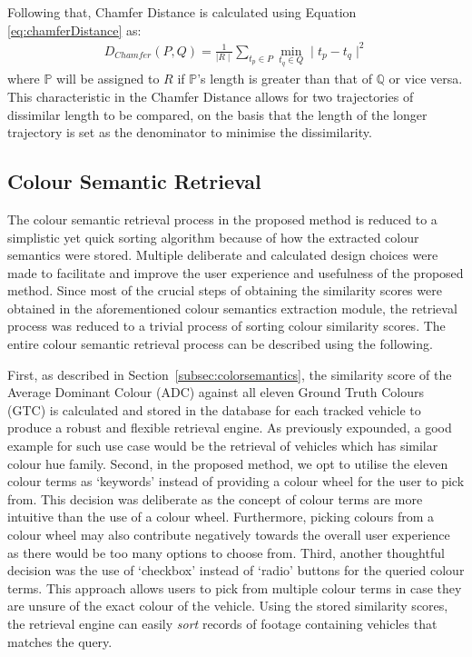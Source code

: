 Following that, Chamfer Distance is calculated using Equation
\ref{eq:chamferDistance} as:
\begin{align}
\label{eq:chamferDistance}
D_{Chamfer} (P,Q) = \frac{1}{\mid R \mid} \sum_{t_p \in P} \min_{t_q \in Q}  \mid t_p - t_q \mid^{2}
\end{align}
where $\mathbb{P}$ will be assigned to $R$ if $\mathbb{P}$'s length is greater than that of $\mathbb{Q}$ or vice versa. This characteristic in the Chamfer Distance allows for two trajectories of dissimilar length to be compared, on the basis that the length of the longer trajectory is set as the denominator to minimise the dissimilarity. 

\subsection{Colour Semantic Retrieval}
\label{section:colourretrieval}

The colour semantic retrieval process in the proposed method is reduced to a simplistic yet quick sorting algorithm because of how the extracted colour semantics were stored. 
Multiple deliberate and calculated design choices were made to facilitate and improve the user experience and usefulness of the proposed method.
Since most of the crucial steps of obtaining the similarity scores were obtained in the aforementioned colour semantics extraction module, the retrieval process was reduced to a trivial process of sorting colour similarity scores. 
The entire colour semantic retrieval process can be described using the following.

First, as described in Section~\ref{subsec:colorsemantics}, the similarity score of the Average Dominant Colour (ADC) against all eleven Ground Truth Colours (GTC) is calculated and stored in the database for each tracked vehicle to produce a robust and flexible retrieval engine.
As previously expounded, a good example for such use case would be the retrieval of vehicles which has similar colour hue family. 
Second, in the proposed method, we opt to utilise the eleven colour terms as `keywords' instead of providing a colour wheel for the user to pick from. 
This decision was deliberate as the concept of colour terms are more intuitive than the use of a colour wheel.
Furthermore, picking colours from a colour wheel may also contribute negatively towards the overall user experience as there would be too many options to choose from. 
Third, another thoughtful decision was the use of `checkbox' instead of `radio' buttons for the queried colour terms.
This approach allows users to pick from multiple colour terms in case they are unsure of the exact colour of the vehicle.
Using the stored similarity scores, the retrieval engine can easily \emph{sort} records of footage containing vehicles that matches the query. 

